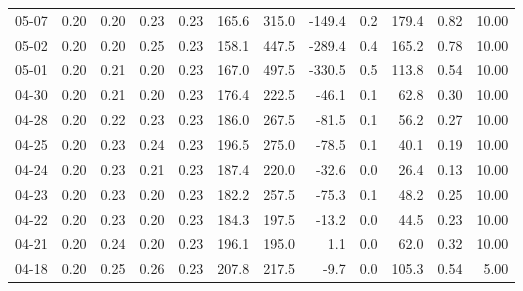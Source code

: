 \begin{threeparttable}
{\begin{tabular}{lrrrrrrrrrrr}
  05-07 &          0.20 &          0.20 &          0.23 &        0.23 &               165.6 &               315.0 &     -149.4 &                 0.2 &            179.4 &            0.82 &                  10.00 \\
  05-02 &          0.20 &          0.20 &          0.25 &        0.23 &               158.1 &               447.5 &     -289.4 &                 0.4 &            165.2 &            0.78 &                  10.00 \\
  05-01 &          0.20 &          0.21 &          0.20 &        0.23 &               167.0 &               497.5 &     -330.5 &                 0.5 &            113.8 &            0.54 &                  10.00 \\
  04-30 &          0.20 &          0.21 &          0.20 &        0.23 &               176.4 &               222.5 &      -46.1 &                 0.1 &             62.8 &            0.30 &                  10.00 \\
  04-28 &          0.20 &          0.22 &          0.23 &        0.23 &               186.0 &               267.5 &      -81.5 &                 0.1 &             56.2 &            0.27 &                  10.00 \\
  04-25 &          0.20 &          0.23 &          0.24 &        0.23 &               196.5 &               275.0 &      -78.5 &                 0.1 &             40.1 &            0.19 &                  10.00 \\
  04-24 &          0.20 &          0.23 &          0.21 &        0.23 &               187.4 &               220.0 &      -32.6 &                 0.0 &             26.4 &            0.13 &                  10.00 \\
  04-23 &          0.20 &          0.23 &          0.20 &        0.23 &               182.2 &               257.5 &      -75.3 &                 0.1 &             48.2 &            0.25 &                  10.00 \\
  04-22 &          0.20 &          0.23 &          0.20 &        0.23 &               184.3 &               197.5 &      -13.2 &                 0.0 &             44.5 &            0.23 &                  10.00 \\
  04-21 &          0.20 &          0.24 &          0.20 &        0.23 &               196.1 &               195.0 &        1.1 &                 0.0 &             62.0 &            0.32 &                  10.00 \\
  04-18 &          0.20 &          0.25 &          0.26 &        0.23 &               207.8 &               217.5 &       -9.7 &                 0.0 &            105.3 &            0.54 &                   5.00 \\

\end{tabular}}
\end{threeparttable}

